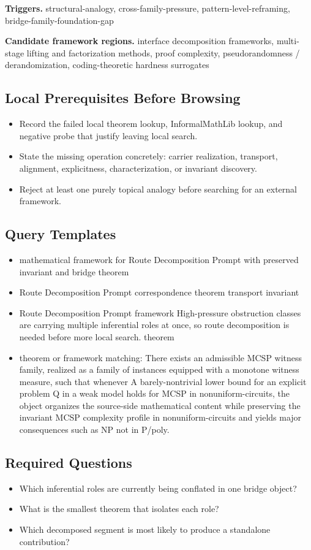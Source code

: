 \documentclass[11pt]{article}
\begin{document}
\textbf{Triggers.} structural-analogy, cross-family-pressure, pattern-level-reframing, bridge-family-foundation-gap

\textbf{Candidate framework regions.} interface decomposition frameworks, multi-stage lifting and factorization methods, proof complexity, pseudorandomness / derandomization, coding-theoretic hardness surrogates

\subsection*{Local Prerequisites Before Browsing}
\begin{itemize}[leftmargin=*,itemsep=0.2em]
\item Record the failed local theorem lookup, InformalMathLib lookup, and negative probe that justify leaving local search.
\item State the missing operation concretely: carrier realization, transport, alignment, explicitness, characterization, or invariant discovery.
\item Reject at least one purely topical analogy before searching for an external framework.
\end{itemize}
\subsection*{Query Templates}
\begin{itemize}[leftmargin=*,itemsep=0.2em]
\item mathematical framework for Route Decomposition Prompt with preserved invariant and bridge theorem
\item Route Decomposition Prompt correspondence theorem transport invariant
\item Route Decomposition Prompt framework High-pressure obstruction classes are carrying multiple inferential roles at once, so route decomposition is needed before more local search. theorem
\item theorem or framework matching: There exists an admissible MCSP witness family, realized as a family of instances equipped with a monotone witness measure, such that whenever A barely-nontrivial lower bound for an explicit problem Q in a weak model holds for MCSP in nonuniform-circuits, the object organizes the source-side mathematical content while preserving the invariant MCSP complexity profile in nonuniform-circuits and yields major consequences such as NP not in P/poly.
\end{itemize}
\subsection*{Required Questions}
\begin{itemize}[leftmargin=*,itemsep=0.2em]
\item Which inferential roles are currently being conflated in one bridge object?
\item What is the smallest theorem that isolates each role?
\item Which decomposed segment is most likely to produce a standalone contribution?
\end{itemize}
\end{document}
